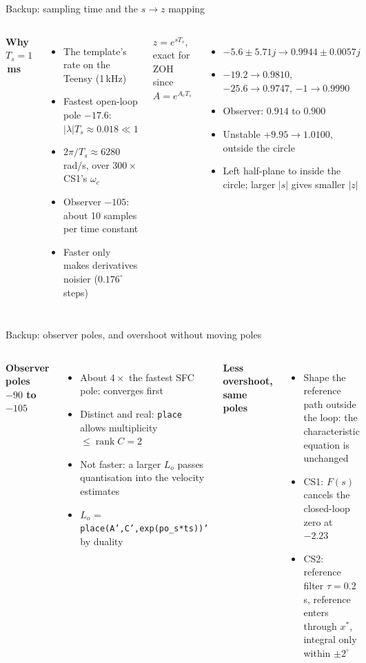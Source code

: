 \documentclass[aspectratio=169,10pt]{beamer}
\begin{document}
\begin{frame}{Backup: sampling time and the $s\to z$ mapping}
\begin{columns}[T,onlytextwidth]
\textbf{Why $T_s=1$\,ms}
\begin{itemize}
  \item The template's rate on the Teensy (1\,kHz)
  \item Fastest open-loop pole $-17.6$: $|\lambda|T_s\approx0.018\ll1$
  \item $2\pi/T_s\approx6280$\,rad/s, over $300\times$ CS1's $\omega_c$
  \item Observer $-105$: about 10 samples per time constant
  \item Faster only makes derivatives noisier ($0.176^\circ$ steps)
\end{itemize}
\textbf{$z=e^{sT_s}$}, exact for ZOH since $A=e^{A_cT_s}$
\begin{itemize}
  \item $-5.6\pm5.71j\to0.9944\pm0.0057j$
  \item $-19.2\to0.9810$, $-25.6\to0.9747$, $-1\to0.9990$
  \item Observer: $0.914$ to $0.900$
  \item Unstable $+9.95\to1.0100$, outside the circle
  \item Left half-plane to inside the circle; larger $|s|$ gives smaller $|z|$
\end{itemize}
\end{columns}
\end{frame}

\begin{frame}{Backup: observer poles, and overshoot without moving poles}
\begin{columns}[T,onlytextwidth]
\textbf{Observer poles $-90$ to $-105$}
\begin{itemize}
  \item About $4\times$ the fastest SFC pole: converges first
  \item Distinct and real: \texttt{place} allows multiplicity $\le\operatorname{rank}C=2$
  \item Not faster: a larger $L_o$ passes quantisation into the velocity estimates
  \item $L_o$ = \texttt{place(A',C',exp(po\_s*ts))'} by duality
\end{itemize}
\textbf{Less overshoot, same poles}
\begin{itemize}
  \item Shape the reference path outside the loop: the characteristic equation is unchanged
  \item CS1: $F(s)$ cancels the closed-loop zero at $-2.23$
  \item CS2: reference filter $\tau=0.2$\,s, reference enters through $x^*$, integral only within $\pm2^\circ$
\end{itemize}
\end{columns}
\end{frame}
\end{document}
